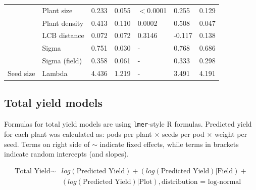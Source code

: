 \documentclass[12pt]{article} %
\begin{document}
\begin{longtable}{l|l|r|r|l|l|l}
\cline{2-7}
 & Plant size & 0.233 & 0.055 & $<$0.0001 & 0.255 & 0.129\\
\cline{2-7}
 & Plant density & 0.413 & 0.110 & 0.0002 & 0.508 & 0.047\\
\cline{2-7}
 & LCB distance & 0.072 & 0.072 & 0.3146 & -0.117 & 0.138\\
\cline{2-7}
 & Sigma & 0.751 & 0.030 & - & 0.768 & 0.686\\
\cline{2-7}
 & Sigma (field) & 0.358 & 0.061 & - & 0.333 & 0.298\\
\cline{2-7}
\multirow{-8}{*}{\raggedright\arraybackslash Seed size} & Lambda & 4.436 & 1.219 & - & 3.491 & 4.191\\
\hline
\end{longtable}
\endgroup{}


\clearpage

\subsection*{Total yield models}

Formulas for total yield models are  using \texttt{lmer}-style R formulas. Predicted yield for each plant was calculated as: pods per plant $\times$ seeds per pod $\times$ weight per seed. Terms on right side of $\sim$ indicate fixed effects, while terms in brackets indicate random intercepts (and slopes). 

\begin{align*}
    \text{Total Yield} \sim & log(\text{Predicted Yield}) + (log(\text{Predicted Yield})|\text{Field}) + \\
    & (log(\text{Predicted Yield})|\text{Plot}), \text{distribution = log-normal} \\
\end{align*}
\end{document}
